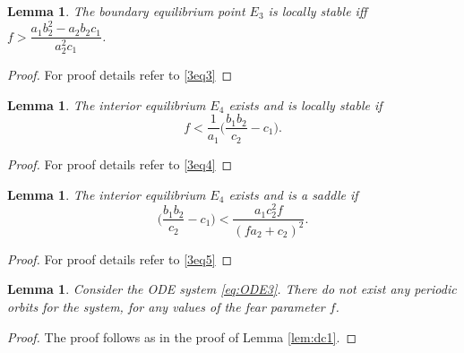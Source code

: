 \documentclass[10pt]{amsart}
\newtheorem{lemma}[theorem]{Lemma}
\theoremstyle{definition}
\begin{document}
\begin{lemma}
	The boundary equilibrium point $E_3$ is locally stable iff $f>\dfrac{a_1 b_2^2 - a_2 b_2 c_1}{a_2^2 c_1}$.
\end{lemma}

\begin{proof}
	For proof details refer to \eqref{3eq3}
\end{proof}

\begin{lemma}\label{lem:coexi_ode2}
	The interior equilibrium $E_4$ exists and is locally stable  if  
	\[ f < \frac{1}{a_1} \Big( \frac{b_1b_2}{c_2} - c_1 \Big).\]
\end{lemma}

\begin{proof}
	For proof details refer to \eqref{3eq4}
\end{proof}

\begin{lemma}\label{lem:strong_ode2}
	The interior equilibrium $E_4$ exists and is a saddle  if  
	\[\Big( \dfrac{b_1 b_2}{c_2} -c_1 \Big)< \dfrac{a_1 c_2^2 f}{(f a_2 +c_2)^2}.\]
\end{lemma}

\begin{proof}
	For proof details refer to \eqref{3eq5}
\end{proof}


\begin{lemma}\label{lem:dc2}
	Consider the ODE system \eqref{eq:ODE3}. There do not exist any periodic orbits for the system, for any values of the fear parameter $f$.
\end{lemma}

\begin{proof}
	The proof follows as in the proof of Lemma \ref{lem:dc1}.
\end{proof}
\end{document}
